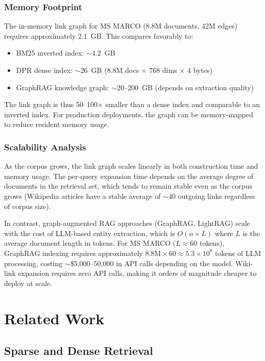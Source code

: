 \documentclass[sigconf,review]{acmart}
\begin{document}
\subsubsection{Memory Footprint}
The in-memory link graph for MS MARCO (8.8M documents, 42M edges) requires
approximately 2.1~GB. This compares favorably to:
\begin{itemize}[leftmargin=*,nosep]
\item BM25 inverted index: ${\sim}$4.2~GB
\item DPR dense index: ${\sim}$26~GB (8.8M docs $\times$ 768 dims $\times$ 4 bytes)
\item GraphRAG knowledge graph: ${\sim}$20--200~GB (depends on extraction quality)
\end{itemize}
The link graph is thus 50--100$\times$ smaller than a dense index and
comparable to an inverted index. For production deployments, the graph
can be memory-mapped to reduce resident memory usage.

\subsubsection{Scalability Analysis}
As the corpus grows, the link graph scales linearly in both construction
time and memory usage. The per-query expansion time depends on the average
degree of documents in the retrieval set, which tends to remain stable
even as the corpus grows (Wikipedia articles have a stable average of
${\sim}$40 outgoing links regardless of corpus size).

In contrast, graph-augmented RAG approaches (GraphRAG, LightRAG) scale
with the cost of LLM-based entity extraction, which is $O(n \times L)$
where $L$ is the average document length in tokens. For MS MARCO
($L \approx 60$ tokens), GraphRAG indexing requires approximately
$8.8\text{M} \times 60 \approx 5.3 \times 10^8$ tokens of LLM processing,
costing ${\sim}$\$5,000--50,000 in API calls depending on the model.
Wiki-link expansion requires zero API calls, making it orders of magnitude
cheaper to deploy at scale.


\section{Related Work}
\label{sec:related}

\subsection{Sparse and Dense Retrieval}
\end{document}
